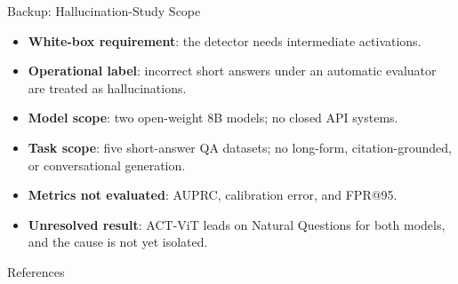 \documentclass[aspectratio=1610]{beamer}
\begin{document}
\begin{frame}{Backup: Hallucination-Study Scope}
\begin{itemize}
  \item \textbf{White-box requirement}: the detector needs intermediate activations.
  \item \textbf{Operational label}: incorrect short answers under an automatic evaluator are treated as hallucinations.
  \item \textbf{Model scope}: two open-weight 8B models; no closed API systems.
  \item \textbf{Task scope}: five short-answer QA datasets; no long-form, citation-grounded, or conversational generation.
  \item \textbf{Metrics not evaluated}: AUPRC, calibration error, and FPR@95.
  \item \textbf{Unresolved result}: ACT-ViT leads on Natural Questions for both models, and the cause is not yet isolated.
\end{itemize}
\end{frame}

\begin{frame}{References}
\footnotesize
\nocite{hendrycks2016baseline,huang2020survey,li2023halueval,lin2021truthfulqa,chen2020simple,selvaraju2017grad,oquab2023dinov2,Papyan2020nc,barshalom2025actvit,farquhar2024detecting,khosla2020supervised,oord2018representation}

\end{frame}
\end{document}
